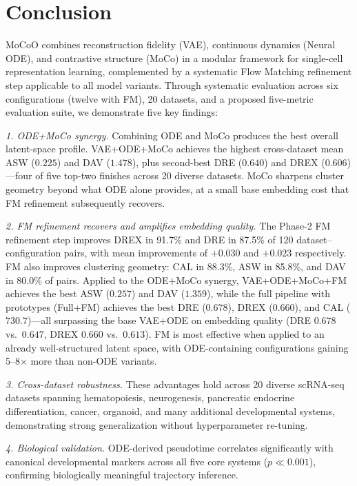 \documentclass[journal]{IEEEtran}
\begin{document}
\section{Conclusion}
\label{sec:conclusion}

MoCoO combines reconstruction fidelity (VAE), continuous dynamics (Neural ODE), and contrastive structure (MoCo) in a modular framework for single-cell representation learning, complemented by a systematic Flow Matching refinement step applicable to all model variants. Through systematic evaluation across six configurations (twelve with FM), 20 datasets, and a proposed five-metric evaluation suite, we demonstrate five key findings:

\textit{1. ODE+MoCo synergy.} Combining ODE and MoCo produces the best overall latent-space profile. VAE+ODE+MoCo achieves the highest cross-dataset mean ASW ($0.225$) and DAV ($1.478$), plus second-best DRE ($0.640$) and DREX ($0.606$)---four of five top-two finishes across 20 diverse datasets. MoCo sharpens cluster geometry beyond what ODE alone provides, at a small base embedding cost that FM refinement subsequently recovers.

\textit{2. FM refinement recovers and amplifies embedding quality.} The Phase-2 FM refinement step improves DREX in 91.7\% and DRE in 87.5\% of 120 dataset--configuration pairs, with mean improvements of $+0.030$ and $+0.023$ respectively. FM also improves clustering geometry: CAL in 88.3\%, ASW in 85.8\%, and DAV in 80.0\% of pairs. Applied to the ODE+MoCo synergy, VAE+ODE+MoCo+FM achieves the best ASW ($0.257$) and DAV ($1.359$), while the full pipeline with prototypes (Full+FM) achieves the best DRE ($0.678$), DREX ($0.660$), and CAL ($730.7$)---all surpassing the base VAE+ODE on embedding quality (DRE $0.678$ vs.\ $0.647$, DREX $0.660$ vs.\ $0.613$). FM is most effective when applied to an already well-structured latent space, with ODE-containing configurations gaining 5--8$\times$ more than non-ODE variants.

\textit{3. Cross-dataset robustness.} These advantages hold across 20 diverse scRNA-seq datasets spanning hematopoiesis, neurogenesis, pancreatic endocrine differentiation, cancer, organoid, and many additional developmental systems, demonstrating strong generalization without hyperparameter re-tuning.

\textit{4. Biological validation.} ODE-derived pseudotime correlates significantly with canonical developmental markers across all five core systems ($p \ll 0.001$), confirming biologically meaningful trajectory inference.
\end{document}
